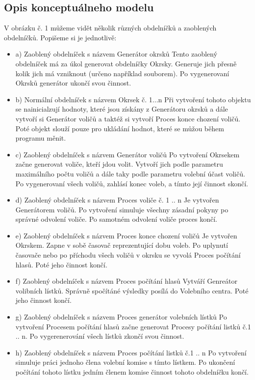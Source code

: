\documentclass[12pt,a4paper,titlepage,final]{article}
\begin{document}
\subsection{Opis konceptuálneho modelu}
 V obrázku č. 1 můžeme vidět několik různých obdelníčků a zaoblených obdelníčků. Popišeme si je jednotlivě: 
 \begin{itemize}
\item    a) Zaoblený obdelníček s názvem Generátor okrsků
\subitem  Tento zaoblený obdelníček má za úkol generovat obdelníčky Okrsky. Generuje jich přesně kolik jich má vzniknout (určeno například souborem). Po vygenerovaní Okrsků generátor ukončí svou činnost.
\item    b) Normální obdelníček s názvem Okrsek č. 1...n
\subitem  Při vytvoření tohoto objektu  se nainicialzují hodnoty, které jsou získány z Generátoru okrsků a dále vytvoří si Generátor voličů a taktéž si vytvoří Proces konce chození voličů. Poté objekt slouží pouze pro ukládání hodnot, které se můžou během programu měnit.
\item    c) Zaoblený obdelníček s názvem Generátor voličů
\subitem  Po vytvoření Okrsekem začne generovat voliče, kteří jdou volit. Vytvoří jich podle parametru maximálního počtu voličů a dále taky podle parametru volební účast voličů. Po vygenerovaní všech voličů, zahlásí konec voleb, a tímto její činnost skončí. 
\item    d) Zaoblený obdelníček s názvem Proces voliče č. 1 .. n
\subitem  Je vytvořen Generátorem voličů. Po vytvoření simuluje všechny zásadní pokyny po správné odvolení voliče. Po samotném odvolení voliče proces končí.
 \item   e) Zaoblený obdelníček s názvem Proces konce chození voličů
\subitem  Je vytvořen Okrskem. Zapne v sobě časovač reprezentující dobu voleb. Po uplynutí časovače nebo po příchodu všech voličů v okrsku se vyvolá Proces počítání hlasů. Poté jeho činnost končí.
\item    f) Zaoblený obdelníček s názvem Proces počítání hlasů
\subitem  Vytváří Genreátor volibních lístků. Správně spočítáné výsledky posílá do Volebního centra. Poté jeho činnost končí.
\item    g) Zaoblený obdelníček s názvem Proces generátor volebních lístků
\subitem  Po vytvoření Procesem počítání hlasů začne generovat Procesy počítání listků č.1 .. n. Po vygerenerování všech lístků zkončí svou činnost.
\item    h) Zaoblený obdelníček s názvem Proces počítání listků č.1 .. n
\subitem  Po vytvoření simuluje práci jednoho člena volební komise s tímto lístkem. Po ukončení počítání tohoto lístku jedním členem komise činnost tohoto obdelníčku končí.
\end{itemize}
\end{document}
